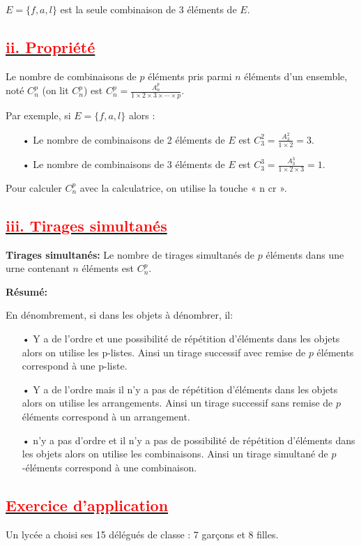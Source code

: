 \documentclass[12pt]{article}
\begin{document}
$E = \{f, a, l\}$ est la seule combinaison de 3 éléments de $E$.
\subsection*{\underline{\textbf{\textcolor{red}{ii. Propriété }}}}
Le nombre de combinaisons de $p$ éléments pris parmi $n$ éléments d'un ensemble, noté $C_{n}^{p}$ (on lit $C_{n}^{p}$) est $C_{n}^{p} = \frac{A_{n}^{p}}{1 \times 2 \times 3 \times \cdots \times p}$.

Par exemple, si $E = \{f, a, l\}$ alors :
\begin{itemize}
  \item[•] Le nombre de combinaisons de 2 éléments de $E$ est $C_{3}^{2} = \frac{A_{3}^{2}}{1 \times 2} = 3$.
  \item[•] Le nombre de combinaisons de 3 éléments de $E$ est $C_{3}^{3} = \frac{A_{3}^{3}}{1 \times 2 \times 3} = 1$.
\end{itemize}
Pour calculer $C_{n}^{p}$ avec la calculatrice, on utilise la touche « n cr ».
\subsection*{\underline{\textbf{\textcolor{red}{iii. Tirages simultanés}}}}
\textbf{Tirages simultanés:} Le nombre de tirages simultanés de $p$ éléments dans une urne contenant $n$ éléments est $C_{n}^{p}$.

\textbf{Résumé:}

En dénombrement, si dans les objets à dénombrer, il:
\begin{itemize}
    \item[•] Y a de l’ordre et une possibilité de répétition d’éléments dans les objets alors on utilise les p-listes. Ainsi un tirage successif avec remise de $p$ éléments correspond à une p-liste.
    \item[•] Y a de l’ordre mais il n’y a pas de répétition d’éléments dans les objets alors on utilise les arrangements. Ainsi un tirage successif sans remise de $p$ éléments correspond à un arrangement.
    \item[•] n’y a pas d’ordre et il n’y a pas de possibilité de répétition d’éléments dans les objets alors on utilise les combinaisons. Ainsi un tirage simultané de $p$-éléments correspond à une combinaison.
\end{itemize}
\subsection*{\underline{\textbf{\textcolor{red}{Exercice d’application}}}}
Un lycée a choisi ses 15 délégués de classe : 7 garçons et 8 filles.
\end{document}
